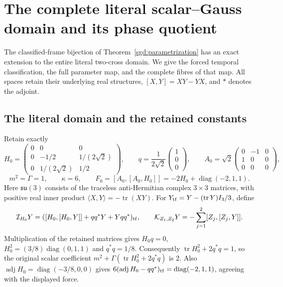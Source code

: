 
\section{The complete literal scalar--Gauss domain and its phase quotient}
\label{sgd:literal-addon:section}

The classified-frame bijection of Theorem~\ref{sgd:parametrization}
has an exact extension to the entire literal two-cross domain.
We give the forced temporal classification, the full parameter map,
and the complete fibres of that map. All spaces retain their underlying
real structures, $[X,Y]=XY-YX$, and $*$ denotes the adjoint.

\subsection{The literal domain and the retained constants}

Retain exactly
\[
 H_0=\begin{pmatrix}0&0&0\\0&-1/2&1/(2\sqrt2)\\
 0&1/(2\sqrt2)&1/2\end{pmatrix},\qquad
 q=\frac1{2\sqrt2}\begin{pmatrix}1\\0\\0\end{pmatrix},\qquad
 A_0=\sqrt2\begin{pmatrix}0&-1&0\\1&0&0\\0&0&0\end{pmatrix},
\]
\[
 m^2=\Gamma=1,\qquad \kappa=6,\qquad
 F_0=[A_0,[A_0,H_0]]=-2H_0+\operatorname{diag}(-2,1,1).
\]
Here $\mathfrak{su}(3)$ consists of the traceless anti-Hermitian complex
$3\times3$ matrices, with positive real inner product
$\langle X,Y\rangle=-\operatorname{tr}(XY)$.
For $Y_{\rm tf}=Y-(\operatorname{tr}Y)I_3/3$, define
\[
 \mathcal I_{H_0}Y
 =([H_0,[H_0,Y]]+qq^*Y+Yqq^*)_{\rm tf},\qquad
 \mathcal K_{Z_1,Z_2}Y=-\sum_{j=1}^2[Z_j,[Z_j,Y]].
\]
Multiplication of the retained matrices gives
$H_0q=0$, $H_0^2=(3/8)\operatorname{diag}(0,1,1)$ and $q^*q=1/8$.
Consequently $\operatorname{tr}H_0^2+2q^*q=1$, so the original
scalar coefficient $m^2+\Gamma(\operatorname{tr}H_0^2+2q^*q)$ is $2$.
Also $\operatorname{adj}H_0=\operatorname{diag}(-3/8,0,0)$ gives
$6(\operatorname{adj}H_0-qq^*)_{\rm tf}
=\operatorname{diag}(-2,1,1)$, agreeing with the displayed force.

